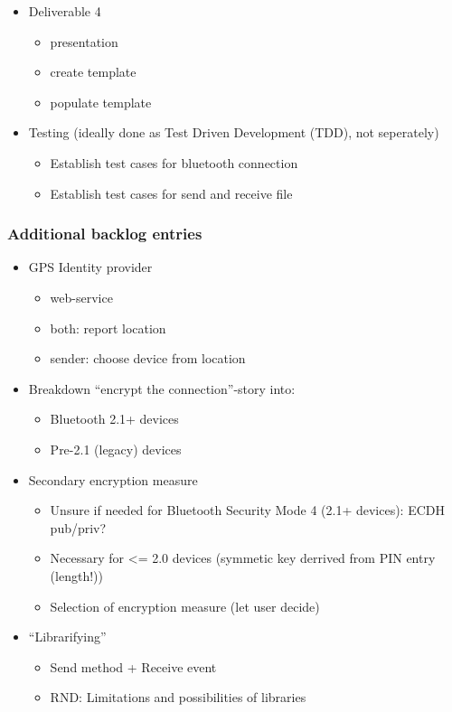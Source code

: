 \documentclass[a4paper,11pt]{article}
\begin{document}
\begin{itemize}
\begin{itemize}
\end{itemize}
\item Deliverable 4
\begin{itemize}
\item presentation
\item create template
\item populate template
\end{itemize}
\item Testing (ideally done as Test Driven Development (TDD), not seperately)
\begin{itemize}
\item Establish test cases for bluetooth connection
\item Establish test cases for send and receive file
\end{itemize}
\end{itemize}

\subsubsection{Additional backlog entries}
\begin{itemize}
\item GPS Identity provider
\begin{itemize}
\item web-service
\item both: report location
\item sender: choose device from location
\end{itemize}
\item Breakdown “encrypt the connection”-story into:
\begin{itemize}
\item Bluetooth 2.1+ devices
\item Pre-2.1 (legacy) devices
\end{itemize}
\item Secondary encryption measure
\begin{itemize}
\item Unsure if needed for Bluetooth Security Mode 4 (2.1+ devices): ECDH pub/priv?
\item Necessary for <= 2.0 devices  (symmetic key derrived from PIN entry (length!))
\item Selection of encryption measure (let user decide)
\end{itemize}
\item “Librarifying”
\begin{itemize}
\item Send method + Receive event
\item RND: Limitations and possibilities of libraries
\end{itemize}
\end{itemize}
\end{document}
